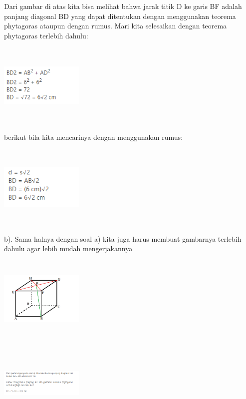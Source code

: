 \documentclass[11pt,fleqn]{book} %
\begin{document}
Dari gambar di atas kita bisa melihat bahwa jarak titik D ke garis BF adalah panjang diagonal BD yang dapat ditentukan dengan menggunakan teorema phytagoras ataupun dengan rumus. Mari kita selesaikan dengan teorema phytagoras terlebih dahulu:

\includegraphics[width = 4cm, height= 4cm]{Pictures/gi17.png}

berikut bila kita mencarinya dengan menggunakan rumus:

\includegraphics[width = 4cm, height= 4cm]{Pictures/gi18.png}

b). Sama halnya dengan soal a) kita juga harus membuat gambarnya terlebih dahulu agar lebih mudah mengerjakannya

\includegraphics[width = 4cm, height= 4cm]{Pictures/gi19.png}

\includegraphics[width = 4cm, height= 4cm]{Pictures/gi20.png}
\end{document}
